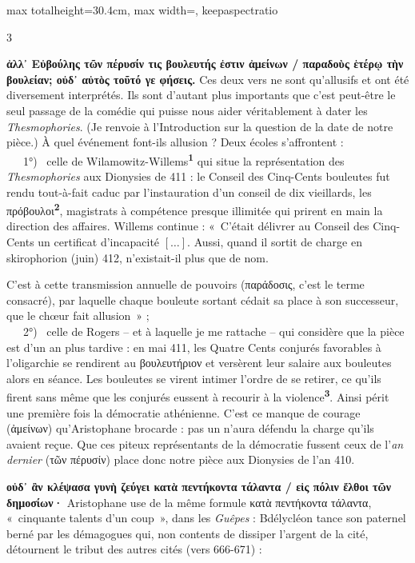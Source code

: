 \documentclass[11pt,twoside]{book}
\newcommand{\italique}[1]{\textit{#1}}
\newcommand{\marqueur}[1]{\textsuperscript{\color{rubricRed}\textbf{#1}}}
\begin{document}
\begin{adjustbox}{max totalheight=30.4cm, max width=\textwidth, keepaspectratio}
\begin{minipage}{\textwidth}
{\begin{multicols}{3}
\par\vspace{1.5pt}
 \textbf{ἀλλ᾽ Εὐβούλης τῶν πέρυσίν τις βουλευτής ἐστιν ἀμείνων / παραδοὺς ἑτέρῳ τὴν βουλείαν; οὐδ᾽ αὐτὸς τοῦτό γε φήσεις.} Ces deux vers ne sont qu'allusifs et ont été diversement interprétés. Ils sont d'autant plus importants que c'est peut-être le seul passage de la comédie qui puisse nous aider véritablement à dater les \italique{Thesmophories}. (Je renvoie à l'Introduction sur la question de la date de notre pièce.) À quel événement font-ils allusion ? Deux écoles s'affrontent :\\ \ \ \ 1°) \ celle de Wilamowitz-Willems\marqueur{1} qui situe la représentation des \italique{Thesmophories} aux Dionysies de 411 : le Conseil des Cinq-Cents bouleutes fut rendu tout-à-fait caduc par l'instauration d'un conseil de dix vieillards, les πρόβουλοι\marqueur{2}, magistrats à compétence presque illimitée qui prirent en main la direction des affaires. Willems continue : «~C'était délivrer au Conseil des Cinq-Cents un certificat d'incapacité  $[\ldots]$. Aussi, quand il sortit de charge en skirophorion (juin) 412, n'existait-il plus que de nom.
\par\vspace{1.5pt}
\noindent [...] C'est à cette transmission annuelle de pouvoirs (παράδοσις, c'est le terme consacré), par laquelle chaque bouleute sortant cédait sa place à son successeur, que le chœur fait allusion~» ;\\ \ \ \ 2°) \ celle de Rogers -- et à laquelle je me rattache -- qui considère que la pièce est d'un an plus tardive : en mai 411, les Quatre Cents conjurés favorables à l'oligarchie se rendirent au βουλευτήριον et versèrent leur salaire aux bouleutes alors en séance. Les bouleutes se virent intimer l'ordre de se retirer, ce qu'ils firent sans même que les conjurés eussent à recourir à la violence\marqueur{3}. Ainsi périt une première fois la démocratie athénienne. C'est ce manque de courage (ἀμείνων) qu'Aristophane brocarde : pas un n'aura défendu la charge qu'ils avaient reçue. Que ces piteux représentants de la démocratie fussent ceux de l'\italique{an dernier} (τῶν πέρυσίν) place donc notre pièce aux Dionysies de l'an 410.
\par\vspace{1.5pt}
 \textbf{οὐδ᾽ ἂν κλέψασα γυνὴ ζεύγει κατὰ πεντήκοντα τάλαντα / εἰς πόλιν ἔλθοι τῶν δημοσίων·} Aristophane use de la même formule κατὰ πεντήκοντα τάλαντα, «~cinquante talents d'un coup~», dans les \italique{Guêpes} : Bdélycléon tance son paternel berné par les démagogues qui, non contents de dissiper l'argent de la cité, détournent le tribut des autres cités (vers 666-671) :

\end{multicols}}
\end{minipage}
\end{adjustbox}
\end{document}
